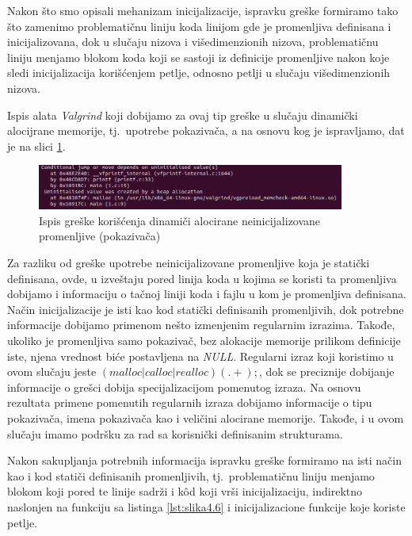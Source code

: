 \documentclass[12pt,oneside]{memoir}
\theoremstyle{plain}
\theoremstyle{definition}
\begin{document}
Nakon što smo opisali mehanizam inicijalizacije, ispravku greške formiramo tako što zamenimo problematičnu liniju koda linijom gde je promenljiva definisana i inicijalizovana, dok u slučaju nizova i višedimenzionih nizova, problematičnu liniju menjamo blokom koda koji se sastoji iz definicije promenljive nakon koje sledi inicijalizacija korišćenjem petlje, odnosno petlji u slučaju višedimenzionih nizova. 

Ispis alata \textit{Valgrind} koji dobijamo za ovaj tip greške u slučaju dinamički alocijrane memorije, tj.~upotrebe pokazivača, a na osnovu kog je ispravljamo, dat je na slici \ref{fig:slika4.7}.

\begin{figure}[!ht]
  \centering
  \includegraphics[width=0.9\textwidth]{UninitialisedDinamic.png}
  \caption{Ispis greške korišćenja dinamiči alocirane neinicijalizovane promenljive (pokazivača)}
  \label{fig:slika4.7}
\end{figure} 

Za razliku od greške upotrebe neinicijalizovane promenljive koja je statički definisana, ovde, u izveštaju pored linija koda u kojima se koristi ta promenljiva dobijamo i informaciju o tačnoj liniji koda i fajlu u kom je promenljiva definisana. Način inicijalizacije je isti kao kod statički definisanih promenljivih, dok potrebne informacije dobijamo primenom nešto izmenjenim regularnim izrazima. Takođe, ukoliko je promenljiva samo pokazivač, bez alokacije memorije prilikom definicije iste, njena vrednost biće postavljena na \textit{NULL}. Regularni izraz koji koristimo u ovom slučaju jeste $ (malloc|calloc|realloc)(.+); $, dok se preciznije dobijanje informacije o grešci dobija specijalizacijom pomenutog izraza. Na osnovu rezultata primene pomenutih regularnih izraza dobijamo informacije o tipu pokazivača, imena pokazivača kao i veličini alocirane memorije. Takođe, i u ovom slučaju imamo podršku za rad sa korisnički definisanim strukturama. 

Nakon sakupljanja potrebnih informacija ispravku greške formiramo na isti način kao i kod statiči definisanih promenljivih, tj.~problematičnu liniju menjamo blokom koji pored te linije sadrži i k\^od koji vrši inicijalizaciju, indirektno naslonjen na funkciju sa listinga \ref{lst:slika4.6} i inicijalizacione funkcije koje koriste petlje.
\end{document}
